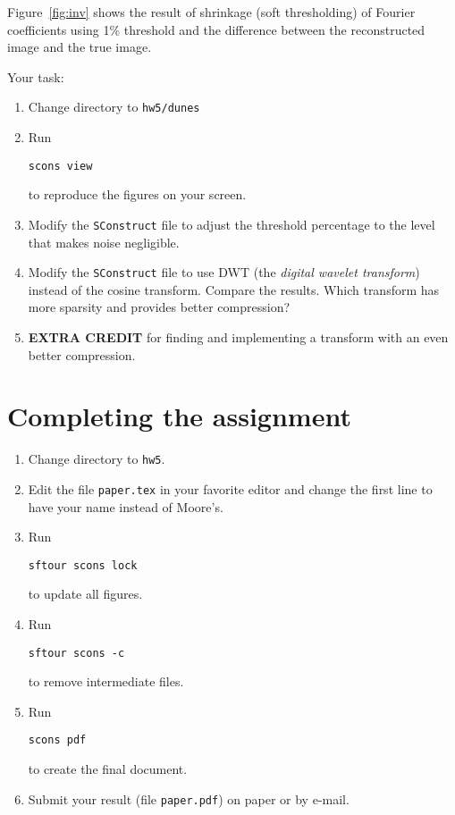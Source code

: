 
Figure~\ref{fig:inv} shows the result of shrinkage (soft thresholding)
of Fourier coefficients using 1\% threshold and the difference between
the reconstructed image and the true image.

Your task:
\begin{enumerate}
\item Change directory to \texttt{hw5/dunes}
\item Run 
\begin{verbatim}
scons view
\end{verbatim}
to reproduce the figures on your screen.
\item Modify the \texttt{SConstruct} file to adjust the threshold percentage to the level that makes noise negligible.
\item  Modify the \texttt{SConstruct} file to use DWT (the \emph{digital wavelet transform}) instead of the cosine transform. 
Compare the results. Which transform has more sparsity and provides better compression? 
\item \textbf{EXTRA CREDIT} for finding and implementing a transform with an even better compression.
\end{enumerate}

\newpage

\lstset{language=python,numbers=left,numberstyle=\tiny,showstringspaces=false}


\newpage

\section{Completing the assignment}

\begin{enumerate}
\item Change directory to \texttt{hw5}.
\item Edit the file \texttt{paper.tex} in your favorite editor and change the
  first line to have your name instead of Moore's.
\item Run
\begin{verbatim}
sftour scons lock
\end{verbatim}
to update all figures.
\item Run
\begin{verbatim}
sftour scons -c
\end{verbatim}
to remove intermediate files.
\item Run
\begin{verbatim}
scons pdf
\end{verbatim}
to create the final document.
\item Submit your result (file \texttt{paper.pdf}) on paper or by
e-mail.
\end{enumerate}

